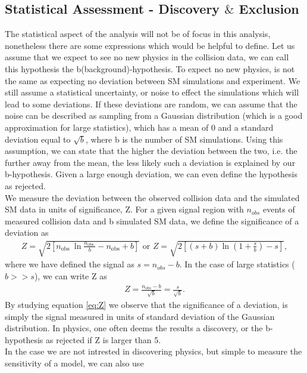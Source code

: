 \subsection{Statistical Assessment - Discovery $\&$ Exclusion}\label{subsec:Sensitivity}
The statistical aspect of the analysis will not be of focus in this analysis, nonetheless there are 
some expressions which would be helpful to define. Let us assume that we expect to see no new physics in the collision
data, we can call this hypothesis the b(background)-hypothesis. To expect no new physics, is not the same as expecting no 
deviation between \ac{SM} simulations and experiment. We still assume a statistical uncertainty, or noise to effect the simulations which 
will lead to some deviations. If these deviations are random, we can assume that the noise can be described as sampling from a Gaussian distribution 
(which is a good approximation for large statistics), which has a mean of 0 and a standard deviation equal to $\sqrt{b}$, where b is 
the number of \ac{SM} simulations. Using this assumption, we can state that the higher the deviation between the two, i.e. the further away 
from the mean, the less likely such a deviation is explained by our b-hypothesis. Given a large enough deviation, we can even 
define the hypothesis as rejected.
\\
We measure the deviation between the observed collision data and the simulated \ac{SM} data in units of significance, Z. 
For a given signal region with $n_{obs}$ events of measured collision data and b simulated \ac{SM} data, we define
the significance of a deviation as
\begin{align}\label{eq:Z1}
Z=\sqrt{2\left[n_{\text {obs }} \ln \frac{n_{\text {obs }}}{b}-n_{\mathrm{obs}}+b\right]} \text { or } 
Z=\sqrt{2\left[(s+b) \ln \left(1+\frac{s}{b}\right)-s\right]}, 
\end{align}
where we have defined the signal as $s = n_{obs} - b$. In the case of large statistics ($b>>s$), we can write Z 
as 
\begin{align}\label{eq:Z}
    Z=\frac{n_{o b s}-b}{\sqrt{b}} = \frac{s}{\sqrt{b}}.
\end{align}
By studying equation \ref{eq:Z} we observe that the significance of a deviation, is simply the signal measured in units of standard
deviation of the Gaussian distribution. In physics, one often deems the results a discovery, or the b-hypothesis as rejected if Z is 
larger than 5. 
\\
In the case we are not intrested in discovering physics, but simple to measure the sensitivity of a model, we can also use 
